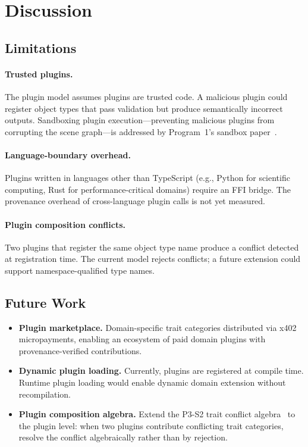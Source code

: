 \documentclass[sigconf,nonacm]{acmart}
\begin{document}
\section{Discussion}
\label{sec:discussion}

\subsection{Limitations}

\paragraph{Trusted plugins.}
The plugin model assumes plugins are trusted code. A
malicious plugin could register object types that pass
validation but produce semantically incorrect outputs.
Sandboxing plugin execution---preventing malicious plugins
from corrupting the scene graph---is addressed by
Program~1's sandbox paper~\cite{paper-4-sandbox-usenix}.

\paragraph{Language-boundary overhead.}
Plugins written in languages other than TypeScript (e.g.,
Python for scientific computing, Rust for performance-critical
domains) require an FFI bridge. The provenance overhead of
cross-language plugin calls is not yet measured.

\paragraph{Plugin composition conflicts.}
Two plugins that register the same object type name produce a
conflict detected at registration time. The current model
rejects conflicts; a future extension could support
namespace-qualified type names.

\subsection{Future Work}

\begin{itemize}
  \item \textbf{Plugin marketplace.} Domain-specific trait
    categories distributed via x402 micropayments, enabling
    an ecosystem of paid domain plugins with provenance-verified
    contributions.
  \item \textbf{Dynamic plugin loading.} Currently, plugins
    are registered at compile time. Runtime plugin loading
    would enable dynamic domain extension without
    recompilation.
  \item \textbf{Plugin composition algebra.} Extend the
    P3-S2 trait conflict algebra~\cite{paper-11-hsplus-ecoop2027}
    to the plugin level: when two plugins contribute
    conflicting trait categories, resolve the conflict
    algebraically rather than by rejection.
\end{itemize}
\end{document}
